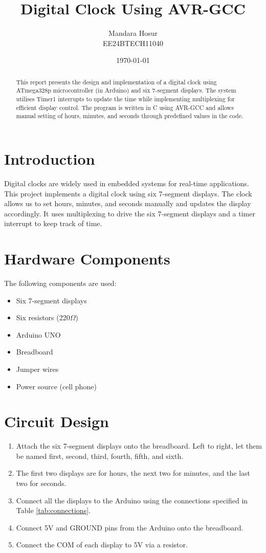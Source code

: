 \documentclass[12pt,a4paper]{article}
\title{\textbf{Digital Clock Using AVR-GCC}}
\author{Mandara Hosur \\EE24BTECH11040}
\date{\today}
\begin{document}
\maketitle

\begin{abstract}
This report presents the design and implementation of a digital clock using ATmega328p microcontroller (in Arduino) and six 7-segment displays. The system utilises Timer1 interrupts to update the time while implementing multiplexing for efficient display control. The program is written in C using AVR-GCC and allows manual setting of hours, minutes, and seconds through predefined values in the code.
\end{abstract}

\section{Introduction}
Digital clocks are widely used in embedded systems for real-time applications. This project implements a digital clock using six 7-segment displays. The clock allows us to set hours, minutes, and seconds manually and updates the display accordingly. It uses multiplexing to drive the six 7-segment displays and a timer interrupt to keep track of time.

\section{Hardware Components}
The following components are used:
\begin{itemize}
    \item Six 7-segment displays
    \item Six resistors (220$\Omega$)
    \item Arduino UNO
    \item Breadboard
    \item Jumper wires
    \item Power source (cell phone)
\end{itemize}

\section{Circuit Design}
\begin{enumerate}
    \item Attach the six 7-segment displays onto the breadboard. Left to right, let them be named first, second, third, fourth, fifth, and sixth.
    \item The first two displays are for hours, the next two for minutes, and the last two for seconds.
    \item Connect all the displays to the Arduino using the connections specified in Table \ref{tab:connections}.
    \item Connect 5V and GROUND pins from the Arduino onto the breadboard.
    \item Connect the COM of each display to 5V via a resistor.
\end{enumerate}

\end{document}
